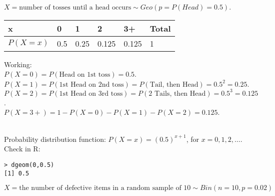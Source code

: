 \documentclass[bigtut]{tutorial}
\begin{document}
\begin{tutorial}
\begin{questions}
\question 

$X = \text{number of tosses until a head occurs} \sim Geo(p=P(Head)=0.5)$. \\

\begin{tabular}{| l | l | l | l | l | l|} \hline
x & 0  \hspace{1cm} & 1 \hspace{1cm}  & 2 \hspace{1cm} & 3+ \hspace{1cm}  &  Total \\ \hline
$P(X=x)$ & 0.5 & 0.25 & 0.125 & 0.125 & 1 \\ \hline
\end{tabular}

\vspace{.5cm}
Working: \\
$P(X=0) = P(\text{Head on 1st toss})= 0.5$.  \\
$P(X=1) = P(\text{1st Head on 2nd toss})= P(\text{Tail, then Head}) = 0.5^2 = 0.25$.\\
$P(X=2) = P(\text{1st Head on 3rd toss})= P(\text{2 Tails, then Head}) = 0.5^3 = 0.125$.\\
$P(X=3+) = 1-P(X=0) - P(X=1) - P(X=2) = 0.125$. \\\

Probability distribution function:
$P(X=x) = (0.5)^{x+1}$, for $x=0,1,2, \ldots$. \\

Check in R: 
\begin{verbatim}
> dgeom(0,0.5)
[1] 0.5
\end{verbatim}


\question 
$X = \text{the number of defective
items in a random sample of 10} \sim Bin(n=10,p=0.02)$ \\

\end{questions}
\end{tutorial}
\end{document}
